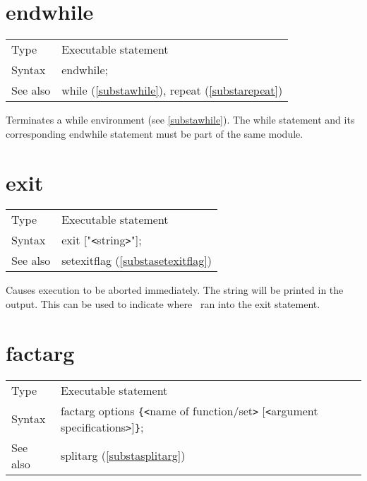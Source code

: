 
\section{endwhile}
\label{substaendwhile}

\noindent \begin{tabular}{ll}
Type & Executable statement\\
Syntax & endwhile;
\\ See also & while (\ref{substawhile}), repeat (\ref{substarepeat})
\end{tabular} \vspace{4mm}

\noindent Terminates a while environment (see \ref{substawhile}). The while 
statement and its corresponding endwhile statement must be part of the same 
module. \vspace{10mm}


\section{exit}
\label{substaexit}

\noindent \begin{tabular}{ll}
Type & Executable statement\\
Syntax & exit ["{\tt<}string{\tt>}"];
\\ See also & setexitflag (\ref{substasetexitflag})
\end{tabular} \vspace{4mm}

\noindent Causes execution to be aborted 
immediately. The string will be printed in the output. This can be used to 
indicate where \FORM\ ran into the exit statement. \vspace{10mm}


\section{factarg}
\label{substafactarg}

\noindent \begin{tabular}{ll}
Type & Executable statement\\
Syntax & factarg options \verb:{:{\tt<}name of function/set{\tt>}
                [{\tt<}argument specifications{\tt>}]\verb:}:;
\\ See also & splitarg (\ref{substasplitarg})
\end{tabular} \vspace{4mm}

